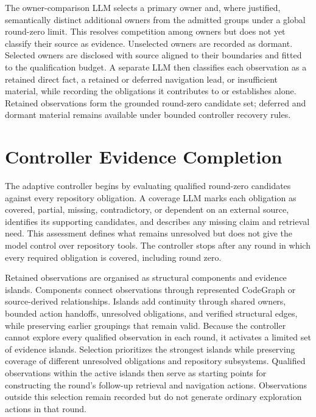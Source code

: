 The owner-comparison LLM selects a primary owner and, where justified, semantically distinct additional owners from the admitted groups under a global round-zero limit. This resolves competition among owners but does not yet classify their source as evidence. Unselected owners are recorded as dormant. Selected owners are disclosed with source aligned to their boundaries and fitted to the qualification budget. A separate LLM then classifies each observation as a retained direct fact, a retained or deferred navigation lead, or insufficient material, while recording the obligations it contributes to or establishes alone. Retained observations form the grounded round-zero candidate set; deferred and dormant material remains available under bounded controller recovery rules.

\section{Controller Evidence Completion}\label{sec:controller-evidence-completion}

The adaptive controller begins by evaluating qualified round-zero candidates against every repository obligation. A coverage LLM marks each obligation as covered, partial, missing, contradictory, or dependent on an external source, identifies its supporting candidates, and describes any missing claim and retrieval need. This assessment defines what remains unresolved but does not give the model control over repository tools. The controller stops after any round in which every required obligation is covered, including round zero.

Retained observations are organised as structural components and evidence islands. Components connect observations through represented CodeGraph or source-derived relationships. Islands add continuity through shared owners, bounded action handoffs, unresolved obligations, and verified structural edges, while preserving earlier groupings that remain valid. Because the controller cannot explore every qualified observation in each round, it activates a limited set of evidence islands. Selection prioritizes the strongest islands while preserving coverage of different unresolved obligations and repository subsystems. Qualified observations within the active islands then serve as starting points for constructing the round's follow-up retrieval and navigation actions. Observations outside this selection remain recorded but do not generate ordinary exploration actions in that round.

